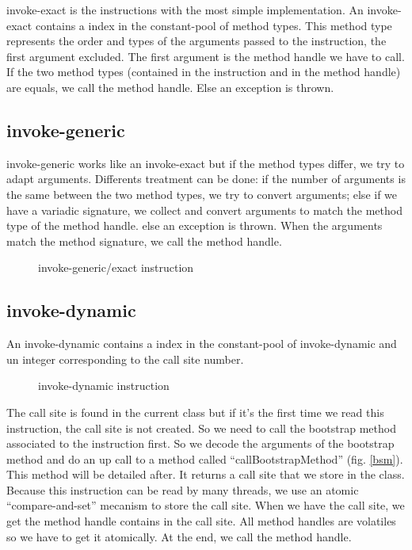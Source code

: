 \documentclass{sigplanconf}
\begin{document}
    invoke-exact is the instructions with the most simple implementation.
    An invoke-exact contains a index in the constant-pool of method types.
    This method type represents the order and types of the arguments passed to the instruction, the first argument excluded.
    The first argument is the method handle we have to call.
    If the two method types (contained in the instruction and in the method handle) are equals, we call the method handle.
    Else an exception is thrown.

  \subsection{invoke-generic}

    invoke-generic works like an invoke-exact but if the method types differ, we try to adapt arguments.
    Differents treatment can be done:
    if the number of arguments is the same between the two method types, we try to convert arguments;
    else if we have a variadic signature, we collect and convert arguments to match the method type of the method handle.
    else an exception is thrown.
    When the arguments match the method signature, we call the method handle.

    \begin{figure}[!h]
      \centering 
      \caption{invoke-generic/exact instruction}
      \label{INGEins}
    \end{figure}

  \subsection{invoke-dynamic}

    An invoke-dynamic contains a index in the constant-pool of invoke-dynamic and un integer corresponding to the call site number.

    \begin{figure}[!h]
      \centering 
      \caption{invoke-dynamic instruction}
      \label{INDYins}
    \end{figure}

    The call site is found in the current class but if it's the first time we read this instruction, the call site is not created.
    So we need to call the bootstrap method associated to the instruction first.
    So we decode the arguments of the bootstrap method and do an up call to a method called ``callBootstrapMethod'' (fig. \ref{bsm}).
    This method will be detailed after.
    It returns a call site that we store in the class.
    Because this instruction can be read by many threads, we use an atomic ``compare-and-set'' mecanism to store the call site.
    When we have the call site, we get the method handle contains in the call site.
    All method handles are volatiles so we have to get it atomically.
    At the end, we call the method handle.
\end{document}

